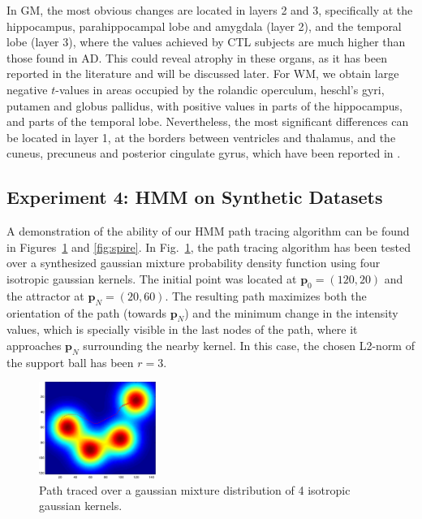 In \ac{GM}, the most obvious changes are located in layers 2 and 3, specifically at the hippocampus, parahippocampal lobe and amygdala (layer 2), and the temporal lobe (layer 3), where the values achieved by \ac{CTL} subjects are much higher than those found in \ac{AD}. This could reveal atrophy in these organs, as it has been reported in the literature \cite{Dubois2007,Pievani2013} and will be discussed later. For \ac{WM}, we obtain large negative $t$-values in areas occupied by the rolandic operculum, heschl's gyri, putamen and globus pallidus, with positive values in parts of the hippocampus, and parts of the temporal lobe. Nevertheless, the most significant differences can be located in layer 1, at the borders between ventricles and thalamus, and the cuneus, precuneus and posterior cingulate gyrus, which have been reported in \cite{Baron2001}.


\subsection{Experiment 4: HMM on Synthetic Datasets}
A demonstration of the ability of our \ac{HMM} path tracing algorithm can be found in Figures~\ref{fig:gaussian} and \ref{fig:spire}. In Fig.~\ref{fig:gaussian}, the path tracing algorithm has been tested over a synthesized gaussian mixture probability density function using four isotropic gaussian kernels. The initial point was located at $\mathbf{p}_0 = (120,20)$ and the attractor at $\mathbf{p}_N = (20, 60)$. The resulting path maximizes both the orientation of the path (towards $\mathbf{p}_N$) and the minimum change in the intensity values, which is specially visible in the last nodes of the path, where it approaches $\mathbf{p}_N$ surrounding the nearby kernel. In this case, the chosen L2-norm of the support ball has been $r=3$. 
\begin{figure}
	\begin{center}
		\includegraphics[width=1.5in]{Graphics/ch6/gaussian}
		\caption{Path traced over a gaussian mixture distribution of 4 isotropic gaussian kernels.}
		\label{fig:gaussian}
	\end{center}
\end{figure}

